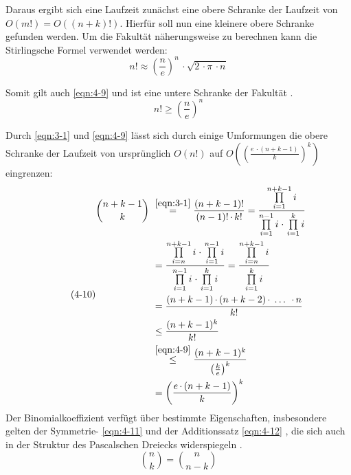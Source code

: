 Daraus ergibt sich eine Laufzeit zunächst eine obere Schranke der Laufzeit von $ O(m!) = O((n + k)!) $. Hierfür soll nun eine kleinere obere Schranke gefunden werden. Um die Fakultät näherungsweise zu berechnen kann die Stirlingsche Formel \cite{bronst} verwendet werden:
\begin{equation} \label{eqn:4-8}
\tag{4-8}
n! \approx \left( \frac{n}{e} \right) ^n \, \cdotp \sqrt{2 \, \cdotp \pi \, \cdotp n}
\end{equation} 

Somit gilt auch \eqref{eqn:4-9} und ist eine untere Schranke der Fakultät \cite{script_binom}.
\begin{equation} \label{eqn:4-9}
\tag{4-9}
n! \geq \left( \frac{n}{e} \right) ^n 
\end{equation} 

Durch \eqref{eqn:3-1} und \eqref{eqn:4-9} lässt sich durch einige Umformungen die obere Schranke der Laufzeit von ursprünglich $ O(n!) $  auf $ O\left( \left( \frac{e \, \cdotp (n + k - 1)}{k}\right)^k\right) $ eingrenzen:
\begin{equation} \label{eqn:4-10}
\tag{4-10}
\begin{aligned}
\binom{n + k - 1}{k} &\ {} \overset{\eqref{eqn:3-1}}{=}  \frac{(n+k-1)!}{(n-1)!\, \cdotp k!} = \frac{\prod\limits_{i=1}^{n+k-1}i}{\prod\limits_{i=1}^{n-1}i \; \cdotp \, \prod\limits_{i=1}^{k}i}  \\
&\ = \frac{\prod\limits_{i=n}^{n+k-1}i \; \cdotp \, \prod\limits_{i=1}^{n-1}i}{\prod\limits_{i=1}^{n-1}i \; \cdotp \, \prod\limits_{i=1}^{k}i} = \frac{\prod\limits_{i=n}^{n+k-1}i}{\prod\limits_{i=1}^{k}i}\\
&\ = \frac{(n + k - 1) \, \cdotp (n + k - 2)\, \cdotp \; \dots \; \, \cdotp n}{k!} \\
&\ \leq \frac{(n + k - 1)^k}{k!} \\
&\ \overset{\eqref{eqn:4-9}}{\leq} \frac{(n + k - 1)^k}{\left( \frac{k}{e} \right) ^k} \\
&\ = \left( \frac{e \, \cdotp (n + k - 1)}{k}\right)^k  \\
\end{aligned}
\end{equation} 
Der Binomialkoeffizient verfügt über bestimmte Eigenschaften, insbesondere gelten der Symmetrie- \eqref{eqn:4-11} und der Additionssatz \eqref{eqn:4-12} , die sich auch in der Struktur des Pascalschen Dreiecks widerspiegeln \cite{bronst}. 
\begin{equation} \label{eqn:4-11}
\tag{4-11}
\binom{n}{k} = \binom{n}{n - k}
\end{equation} 
